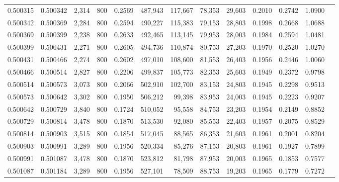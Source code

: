 \begin{tabular}{rrrrrrrrrrrrr}
0.500315 & 0.500342 & 2,314 & 800 &                                     0.2569 & 487,943 & 117,667 &  78,353 &  29,603 & 0.2010 & 0.2742 & 1.0900 \\
0.500342 & 0.500369 & 2,284 & 800 &                                     0.2594 & 490,227 & 115,383 &  79,153 &  28,803 & 0.1998 & 0.2668 & 1.0688 \\
0.500369 & 0.500399 & 2,238 & 800 &                                     0.2633 & 492,465 & 113,145 &  79,953 &  28,003 & 0.1984 & 0.2594 & 1.0481 \\
0.500399 & 0.500431 & 2,271 & 800 &                                     0.2605 & 494,736 & 110,874 &  80,753 &  27,203 & 0.1970 & 0.2520 & 1.0270 \\
0.500431 & 0.500466 & 2,274 & 800 &                                     0.2602 & 497,010 & 108,600 &  81,553 &  26,403 & 0.1956 & 0.2446 & 1.0060 \\
0.500466 & 0.500514 & 2,827 & 800 &                                     0.2206 & 499,837 & 105,773 &  82,353 &  25,603 & 0.1949 & 0.2372 & 0.9798 \\
0.500514 & 0.500573 & 3,073 & 800 &                                     0.2066 & 502,910 & 102,700 &  83,153 &  24,803 & 0.1945 & 0.2298 & 0.9513 \\
0.500573 & 0.500642 & 3,302 & 800 &                                     0.1950 & 506,212 &  99,398 &  83,953 &  24,003 & 0.1945 & 0.2223 & 0.9207 \\
0.500642 & 0.500729 & 3,840 & 800 &                                     0.1724 & 510,052 &  95,558 &  84,753 &  23,203 & 0.1954 & 0.2149 & 0.8852 \\
0.500729 & 0.500814 & 3,478 & 800 &                                     0.1870 & 513,530 &  92,080 &  85,553 &  22,403 & 0.1957 & 0.2075 & 0.8529 \\
0.500814 & 0.500903 & 3,515 & 800 &                                     0.1854 & 517,045 &  88,565 &  86,353 &  21,603 & 0.1961 & 0.2001 & 0.8204 \\
0.500903 & 0.500991 & 3,289 & 800 &                                     0.1956 & 520,334 &  85,276 &  87,153 &  20,803 & 0.1961 & 0.1927 & 0.7899 \\
0.500991 & 0.501087 & 3,478 & 800 &                                     0.1870 & 523,812 &  81,798 &  87,953 &  20,003 & 0.1965 & 0.1853 & 0.7577 \\
0.501087 & 0.501184 & 3,289 & 800 &                                     0.1956 & 527,101 &  78,509 &  88,753 &  19,203 & 0.1965 & 0.1779 & 0.7272 \\

\end{tabular}
